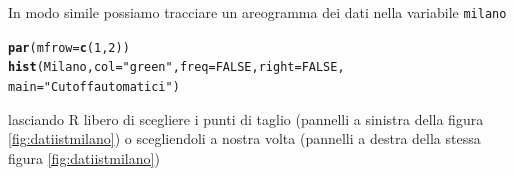 \documentclass[onecolumn,12pt]{book}\usepackage[]{graphicx}\usepackage[]{color}
\makeatletter
\newcommand{\hlnum}[1]{\textcolor[rgb]{0.686,0.059,0.569}{#1}}%
\newcommand{\hlstr}[1]{\textcolor[rgb]{0.192,0.494,0.8}{#1}}%
\newcommand{\hlstd}[1]{\textcolor[rgb]{0.345,0.345,0.345}{#1}}%
\newcommand{\hlkwc}[1]{\textcolor[rgb]{0.333,0.667,0.333}{#1}}%
\newcommand{\hlkwd}[1]{\textcolor[rgb]{0.737,0.353,0.396}{\textbf{#1}}}%
\newenvironment{kframe}{%
 \def\at@end@of@kframe{}%
 \ifinner\ifhmode%
  \def\at@end@of@kframe{\end{minipage}}%
  \begin{minipage}{\columnwidth}%
 \fi\fi%
 \def\FrameCommand##1{\hskip\@totalleftmargin \hskip-\fboxsep
 \colorbox{shadecolor}{##1}\hskip-\fboxsep
     \hskip-\linewidth \hskip-\@totalleftmargin \hskip\columnwidth}%
 \MakeFramed {\advance\hsize-\width
   \@totalleftmargin\z@ \linewidth\hsize
   \@setminipage}}%
 {\par\unskip\endMakeFramed%
 \at@end@of@kframe}
\newenvironment{knitrout}{}{} %
\makeatother
\begin{document}
In modo simile possiamo tracciare un areogramma  dei dati nella variabile \texttt{milano}
\begin{knitrout}
\color{fgcolor}\begin{kframe}
\begin{alltt}
\hlkwd{par}\hlstd{(}\hlkwc{mfrow}\hlstd{=}\hlkwd{c}\hlstd{(}\hlnum{1}\hlstd{,}\hlnum{2}\hlstd{))}
\hlkwd{hist}\hlstd{(Milano,} \hlkwc{col}\hlstd{=}\hlstr{"green"}\hlstd{,}\hlkwc{freq}\hlstd{=}\hlnum{FALSE}\hlstd{,}\hlkwc{right}\hlstd{=}\hlnum{FALSE}\hlstd{,}
\hlkwc{main}\hlstd{=}\hlstr{"Cutoff automatici"}\hlstd{)}
\end{alltt}
\end{kframe}
\end{knitrout}
lasciando \textsf{R} libero di scegliere i punti di taglio (pannelli a sinistra della figura \ref{fig:datiistmilano}) o scegliendoli a nostra volta (pannelli a destra della stessa figura  \ref{fig:datiistmilano})
\end{document}
